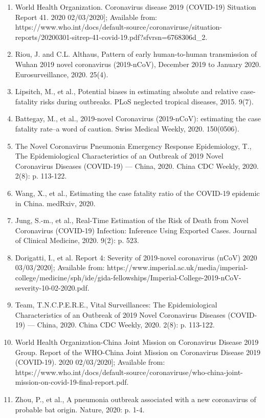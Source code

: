 \documentclass{article}
\begin{document}
\begin{enumerate}
	 

\item World Health Organization. Coronavirus disease 2019 (COVID-19) Situation Report 41. 2020  02/03/2020]; Available from: https://www.who.int/docs/default-source/coronaviruse/situation-reports/20200301-sitrep-41-covid-19.pdf?sfvrsn=6768306d\_2.
\item	Riou, J. and C.L. Althaus, Pattern of early human-to-human transmission of Wuhan 2019 novel coronavirus (2019-nCoV), December 2019 to January 2020. Eurosurveillance, 2020. 25(4).
\item	Lipsitch, M., et al., Potential biases in estimating absolute and relative case-fatality risks during outbreaks. PLoS neglected tropical diseases, 2015. 9(7).
\item	Battegay, M., et al., 2019-novel Coronavirus (2019-nCoV): estimating the case fatality rate–a word of caution. Swiss Medical Weekly, 2020. 150(0506).
\item	The Novel Coronavirus Pneumonia Emergency Response Epidemiology, T., The Epidemiological Characteristics of an Outbreak of 2019 Novel Coronavirus Diseases (COVID-19) — China, 2020. China CDC Weekly, 2020. 2(8): p. 113-122.
\item	Wang, X., et al., Estimating the case fatality ratio of the COVID-19 epidemic in China. medRxiv, 2020.
\item	Jung, S.-m., et al., Real-Time Estimation of the Risk of Death from Novel Coronavirus (COVID-19) Infection: Inference Using Exported Cases. Journal of Clinical Medicine, 2020. 9(2): p. 523.
\item	Dorigatti, I., et al. Report 4: Severity of 2019-novel coronavirus (nCoV) 2020  03/03/2020]; Available from: https://www.imperial.ac.uk/media/imperial-college/medicine/sph/ide/gida-fellowships/Imperial-College-2019-nCoV-severity-10-02-2020.pdf.
\item	Team, T.N.C.P.E.R.E., Vital Surveillances: The Epidemiological Characteristics of an Outbreak of 2019 Novel Coronavirus Diseases (COVID-19) — China, 2020. China CDC Weekly, 2020. 2(8): p. 113-122.
\item	World Health Organization-China Joint Mission on Coronavirus Disease 2019 Group. Report of the WHO-China Joint Mission on Coronavirus Disease 2019 (COVID-19). 2020  02/03/2020]; Available from: https://www.who.int/docs/default-source/coronaviruse/who-china-joint-mission-on-covid-19-final-report.pdf.
\item	Zhou, P., et al., A pneumonia outbreak associated with a new coronavirus of probable bat origin. Nature, 2020: p. 1-4.

\end{enumerate}
\end{document}
